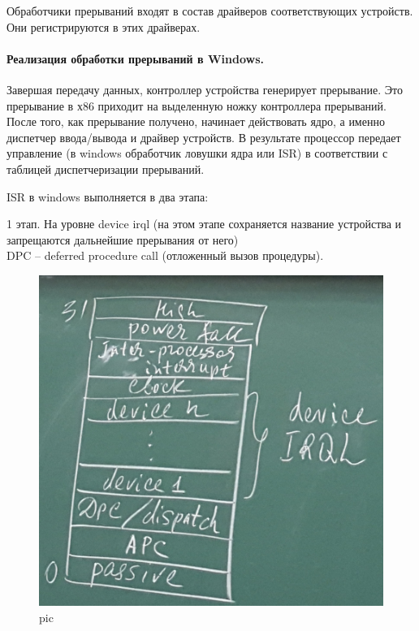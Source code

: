 Обработчики прерываний входят в состав драйверов соответствующих устройств. Они регистрируются в этих драйверах. 

\paragraph{Реализация обработки прерываний в Windows.}

Завершая передачу данных, контроллер устройства генерирует прерывание. Это прерывание в х86 приходит на выделенную ножку контроллера прерываний. После того, как прерывание получено, начинает действовать ядро, а именно диспетчер ввода/вывода и драйвер устройств. В результате процессор передает управление (в windows обработчик ловушки ядра или ISR) в соответствии с таблицей диспетчеризации прерываний. 

ISR в windows выполняется в два этапа: 

1 этап. На уровне device irql (на этом этапе сохраняется название устройства и запрещаются дальнейшие прерывания от него)\\
DPC – deferred procedure call (отложенный вызов процедуры).

\begin{figure}[H]
    \centering
    \includegraphics[width=\textwidth]{pic/6.png}
    \caption{pic}
    \label{pic:pic_lec23_1}
\end{figure}

